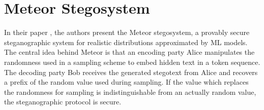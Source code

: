 



\newpage

\section{Meteor Stegosystem}
\label{sec:meteor}
In their paper \cite{Meteor2021}, the authors present the Meteor stegosystem, a provably secure steganographic system for realistic distributions approximated by ML models.
The central idea behind Meteor is that an encoding party Alice manipulates the randomness used in a sampling scheme to embed hidden text in a token sequence.
The decoding party Bob receives the generated stegotext from Alice and recovers a prefix of the random value used during sampling.
If the value which replaces the randomness for sampling is indistinguishable from an actually random value, the steganographic protocol is secure.

